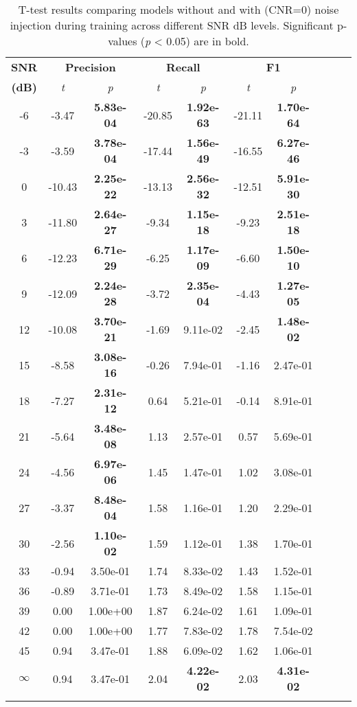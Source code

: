 \documentclass{article}
\begin{document}
\begin{table}[h!]
\centering
\caption{T-test results comparing models without and with (CNR=0) noise injection during training across different SNR dB levels. Significant p-values (\textit{p} < 0.05) are in bold.}
\scriptsize
\begin{tabular}{@{}c ccc ccc ccc@{}} %
\toprule
\textbf{SNR} & \multicolumn{2}{c}{\textbf{Precision}} & \multicolumn{2}{c}{\textbf{Recall}} & \multicolumn{2}{c}{\textbf{F1}} \\ 
\textbf{(dB)} & \textit{t} & \textit{p} & \textit{t} & \textit{p} & \textit{t} & \textit{p} \\
\midrule
-6  & -3.47  & \textbf{5.83e-04}  & -20.85  & \textbf{1.92e-63}  & -21.11  & \textbf{1.70e-64} \\
-3  & -3.59  & \textbf{3.78e-04}  & -17.44  & \textbf{1.56e-49}  & -16.55  & \textbf{6.27e-46} \\
0   & -10.43 & \textbf{2.25e-22}  & -13.13  & \textbf{2.56e-32}  & -12.51  & \textbf{5.91e-30} \\
3   & -11.80 & \textbf{2.64e-27}  & -9.34   & \textbf{1.15e-18}  & -9.23   & \textbf{2.51e-18} \\
6   & -12.23 & \textbf{6.71e-29}  & -6.25   & \textbf{1.17e-09}  & -6.60   & \textbf{1.50e-10} \\
9   & -12.09 & \textbf{2.24e-28}  & -3.72   & \textbf{2.35e-04}  & -4.43   & \textbf{1.27e-05} \\
12  & -10.08 & \textbf{3.70e-21}  & -1.69   & 9.11e-02  & -2.45   & \textbf{1.48e-02} \\
15  & -8.58  & \textbf{3.08e-16}  & -0.26   & 7.94e-01  & -1.16   & 2.47e-01 \\
18  & -7.27  & \textbf{2.31e-12}  & 0.64    & 5.21e-01  & -0.14   & 8.91e-01 \\
21  & -5.64  & \textbf{3.48e-08}  & 1.13    & 2.57e-01  & 0.57    & 5.69e-01 \\
24  & -4.56  & \textbf{6.97e-06}  & 1.45    & 1.47e-01  & 1.02    & 3.08e-01 \\
27  & -3.37  & \textbf{8.48e-04}  & 1.58    & 1.16e-01  & 1.20    & 2.29e-01 \\
30  & -2.56  & \textbf{1.10e-02}  & 1.59    & 1.12e-01  & 1.38    & 1.70e-01 \\
33  & -0.94  & 3.50e-01  & 1.74    & 8.33e-02  & 1.43    & 1.52e-01 \\
36  & -0.89  & 3.71e-01  & 1.73    & 8.49e-02  & 1.58    & 1.15e-01 \\
39  & 0.00   & 1.00e+00  & 1.87    & 6.24e-02  & 1.61    & 1.09e-01 \\
42  & 0.00   & 1.00e+00  & 1.77    & 7.83e-02  & 1.78    & 7.54e-02 \\
45  & 0.94   & 3.47e-01  & 1.88    & 6.09e-02  & 1.62    & 1.06e-01 \\
$\infty$ & 0.94   & 3.47e-01  & 2.04    & \textbf{4.22e-02}  & 2.03    & \textbf{4.31e-02} \\
\bottomrule
\label{tab:1}
\end{tabular}
\end{table}
\end{document}
